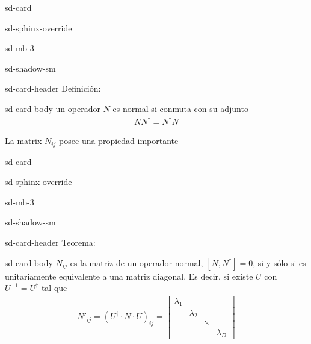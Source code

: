 \documentclass[letterpaper,10pt,english]{jupyterBook}
\begin{document}
\begin{sphinxuseclass}{sd-card}
\begin{sphinxuseclass}{sd-sphinx-override}
\begin{sphinxuseclass}{sd-mb-3}
\begin{sphinxuseclass}{sd-shadow-sm}
\begin{sphinxuseclass}{sd-card-header}
\sphinxAtStartPar
Definición:

\end{sphinxuseclass}
\begin{sphinxuseclass}{sd-card-body}
\sphinxAtStartPar
un operador \(N\)  es normal si conmuta con su adjunto
\begin{equation*}
\begin{split}
NN^\dagger = N^\dagger N
\end{split}
\end{equation*}
\end{sphinxuseclass}
\end{sphinxuseclass}
\end{sphinxuseclass}
\end{sphinxuseclass}
\end{sphinxuseclass}
\sphinxAtStartPar
La matrix \(N_{ij}\) posee una propiedad importante

\begin{sphinxuseclass}{sd-card}
\begin{sphinxuseclass}{sd-sphinx-override}
\begin{sphinxuseclass}{sd-mb-3}
\begin{sphinxuseclass}{sd-shadow-sm}
\begin{sphinxuseclass}{sd-card-header}
\sphinxAtStartPar
Teorema:

\end{sphinxuseclass}
\begin{sphinxuseclass}{sd-card-body}
\sphinxAtStartPar
\(N_{ij}\) es la matriz de un operador normal, \([N,N^\dagger]=0\), si y sólo si es unitariamente equivalente a una matriz diagonal. Es decir, si existe \(U\) con \(U^{-1} = U^\dagger\) tal que
\begin{equation*}
\begin{split}
N'_{ij} = (U^{\dagger}\cdot N \cdot U)_{ij} = 
\begin{bmatrix} \lambda_1 &  & &  \\ & \lambda_2 & &  \\ & & \ddots &  \\ & & & \lambda_D \end{bmatrix}
\end{split}
\end{equation*}
\end{sphinxuseclass}
\end{sphinxuseclass}
\end{sphinxuseclass}
\end{sphinxuseclass}
\end{sphinxuseclass}
\end{document}
